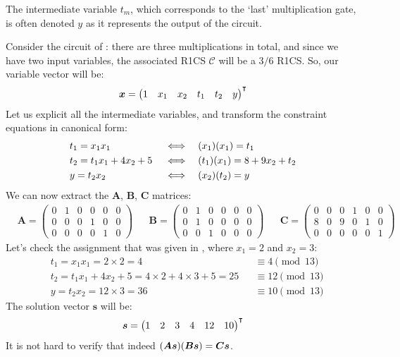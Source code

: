 The intermediate variable \(t_m\), which corresponds to the `last' multiplication gate, is often 
denoted \(y\) as it represents the output of the circuit.
\begin{example}\label{ex:r1cs}
	Consider the circuit of : there are three multiplications in total, 
  and since we have two input variables, the associated R1CS \(\mathcal{C}\) will be a \(3/6\) 
  R1CS\@.
	So, our variable vector will be:
	\[\bm{x} = {\begin{pmatrix}1 & x_1 & x_2 & t_1 & t_2 & y\end{pmatrix}}^{\transpose}\]
  Let us explicit all the intermediate variables, and transform the constraint equations in 
  canonical form:
	\begin{align*}
		 & {t_1 = x_1x_1} && \iff && {\Parens*{x_1}\Parens*{x_1} = t_1} \\ 
     & {t_2 = t_1x_1 + 4x_2 + 5} && \iff && {\Parens*{t_1}\Parens*{x_1} = 8 + 9x_2 + t_2}\\
     & {y = t_2x_2} && \iff && {\Parens*{x_2}\Parens*{t_2} = y}
	\end{align*}
	We can now extract the \(\bm{A}\), \(\bm{B}\), \(\bm{C}\) matrices:
	\begin{align*}
    &
		\bm{A} =
		\begin{pmatrix}
      0 & 1 & 0 & 0 & 0 & 0 \\
      0 & 0 & 0 & 1 & 0 & 0 \\
      0 & 0 & 0 & 0 & 1 & 0
    \end{pmatrix}
    &&
    \bm{B} =
		\begin{pmatrix}
      0 & 1 & 0 & 0 & 0 & 0 \\
      0 & 1 & 0 & 0 & 0 & 0 \\
      0 & 0 & 1 & 0 & 0 & 0
    \end{pmatrix}
    &&
    \bm{C} =
		\begin{pmatrix}
				0 & 0 & 0 & 1 & 0 & 0 \\
				8 & 0 & 9 & 0 & 1 & 0 \\
				0 & 0 & 0 & 0 & 0 & 1
			\end{pmatrix}
  \end{align*}
  Let's check the assignment that was given in , where \(x_1 = 2\) and 
  \(x_2 = 3\):
	\begin{align*}
		 & t_1 = x_1x_1 = 2 \times 2 = 4                              &  & \equiv  4 \pmod{13} \\
		 & t_2 = t_1x_1 + 4x_2 + 5 = 4 \times 2 + 4 \times 3 + 5 = 25 &  & \equiv 12 \pmod{13} \\
		 & y = t_2x_2 = 12 \times 3 = 36                              &  & \equiv 10 \pmod{13}
	\end{align*}
	The solution vector \(\bm{s}\) will be:
	\[\bm{s} = {\begin{pmatrix}1 & 2 & 3 & 4 & 12 & 10\end{pmatrix}}^{\transpose} \]
	It is not hard to verify that indeed
	\(\Parens*{\bm{A}\bm{s}}\Parens*{\bm{B}\bm{s}} = \bm{C}\bm{s}\).
\end{example}

